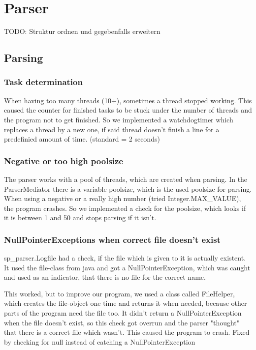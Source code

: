 \section{Parser}

TODO: Struktur ordnen und gegebenfalls erweitern
\subsection{Parsing} 
\subsubsection{Task determination} 
When having too many threads (10+), sometimes a thread stopped working. This caused the counter for finished tasks
to be stuck under the number of threads and the program not to get finished.
So we implemented a watchdogtimer which replaces a thread by a new one, if said thread doesn't finish a line for a 
predefinied amount of time. (standard = 2 seconds)

\subsubsection{Negative or too high poolsize}
The parser works with a pool of threads, which are created when parsing. In the ParserMediator there is
a variable poolsize, which is the used poolsize for parsing.
When using a negative or a really high number (tried Integer.MAX\_VALUE), the program crashes. 
So we implemented a check for the poolsize, which looks if it is between 1 and 50 and stops parsing if it isn't.

\subsubsection{NullPointerExceptions when correct file doesn't exist}
sp\_parser.Logfile had a check, if the file which is given to it is actually existent. It used the file-class from java
and got a NullPointerException, which was caught and used as an indicator, that there is no file for the correct name.

This worked, but to improve our program, we used a class called FileHelper, which creates the file-object one time and
returns it when needed, because other parts of the program need the file too. It didn't return a NullPointerException when 
the file doesn't exist, so this check got overrun and the parser "thought" that there is a correct file which wasn't.
This caused the program to crash. Fixed by checking for null instead of catching a NullPointerException

